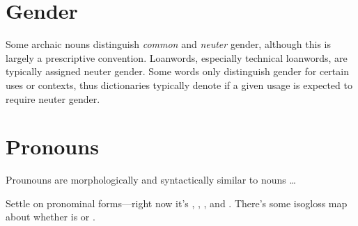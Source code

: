 \section{Gender}
Some archaic nouns distinguish \emph{common} and \emph{neuter} gender, although this is largely a prescriptive convention.  Loanwords, especially technical loanwords, are typically assigned neuter gender. Some words only distinguish gender for certain uses or contexts, thus dictionaries typically denote if a given usage is expected to require neuter gender.

\section{Pronouns}
Prounouns are morphologically and syntactically similar to nouns \dots

\begin{kaobox}[frametitle=\sc todo:]
Settle on pronominal forms---right now it's  ,  ,  , and  . There's some isogloss map about whether  is  or .
\end{kaobox}